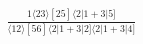 \documentclass[varwidth, border=5pt]{standalone}
\begin{document}
\begin{my}
$\begin{gathered}
\scriptscriptstyle\frac{1⟨23⟩[25]⟨2|1+3|5]}{⟨12⟩[56]⟨2|1+3|2]⟨2|1+3|4]}
\end{gathered}$
\end{my}
\end{document}
